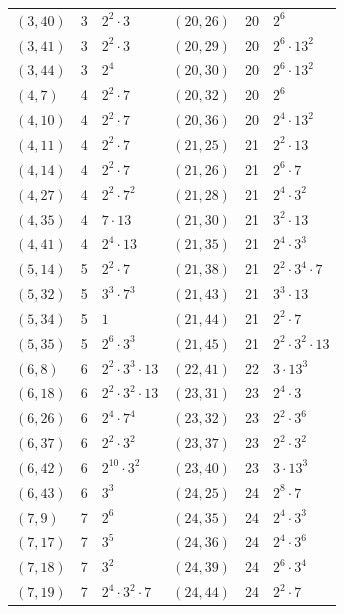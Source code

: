 \documentclass[11pt]{article}
\begin{document}
\begin{longtable}{@{}lrl@{\qquad}lrl@{}}
$(3,40)$ & 3 & $2^{2}\cdot 3$ & $(20,26)$ & 20 & $2^{6}$\\
$(3,41)$ & 3 & $2^{2}\cdot 3$ & $(20,29)$ & 20 & $2^{6}\cdot 13^{2}$\\
$(3,44)$ & 3 & $2^{4}$ & $(20,30)$ & 20 & $2^{6}\cdot 13^{2}$\\
$(4,7)$ & 4 & $2^{2}\cdot 7$ & $(20,32)$ & 20 & $2^{6}$\\
$(4,10)$ & 4 & $2^{2}\cdot 7$ & $(20,36)$ & 20 & $2^{4}\cdot 13^{2}$\\
$(4,11)$ & 4 & $2^{2}\cdot 7$ & $(21,25)$ & 21 & $2^{2}\cdot 13$\\
$(4,14)$ & 4 & $2^{2}\cdot 7$ & $(21,26)$ & 21 & $2^{6}\cdot 7$\\
$(4,27)$ & 4 & $2^{2}\cdot 7^{2}$ & $(21,28)$ & 21 & $2^{4}\cdot 3^{2}$\\
$(4,35)$ & 4 & $7\cdot 13$ & $(21,30)$ & 21 & $3^{2}\cdot 13$\\
$(4,41)$ & 4 & $2^{4}\cdot 13$ & $(21,35)$ & 21 & $2^{4}\cdot 3^{3}$\\
$(5,14)$ & 5 & $2^{2}\cdot 7$ & $(21,38)$ & 21 & $2^{2}\cdot 3^{4}\cdot 7$\\
$(5,32)$ & 5 & $3^{3}\cdot 7^{3}$ & $(21,43)$ & 21 & $3^{3}\cdot 13$\\
$(5,34)$ & 5 & $1$ & $(21,44)$ & 21 & $2^{2}\cdot 7$\\
$(5,35)$ & 5 & $2^{6}\cdot 3^{3}$ & $(21,45)$ & 21 & $2^{2}\cdot 3^{2}\cdot 13$\\
$(6,8)$ & 6 & $2^{2}\cdot 3^{3}\cdot 13$ & $(22,41)$ & 22 & $3\cdot 13^{3}$\\
$(6,18)$ & 6 & $2^{2}\cdot 3^{2}\cdot 13$ & $(23,31)$ & 23 & $2^{4}\cdot 3$\\
$(6,26)$ & 6 & $2^{4}\cdot 7^{4}$ & $(23,32)$ & 23 & $2^{2}\cdot 3^{6}$\\
$(6,37)$ & 6 & $2^{2}\cdot 3^{2}$ & $(23,37)$ & 23 & $2^{2}\cdot 3^{2}$\\
$(6,42)$ & 6 & $2^{10}\cdot 3^{2}$ & $(23,40)$ & 23 & $3\cdot 13^{3}$\\
$(6,43)$ & 6 & $3^{3}$ & $(24,25)$ & 24 & $2^{8}\cdot 7$\\
$(7,9)$ & 7 & $2^{6}$ & $(24,35)$ & 24 & $2^{4}\cdot 3^{3}$\\
$(7,17)$ & 7 & $3^{5}$ & $(24,36)$ & 24 & $2^{4}\cdot 3^{6}$\\
$(7,18)$ & 7 & $3^{2}$ & $(24,39)$ & 24 & $2^{6}\cdot 3^{4}$\\
$(7,19)$ & 7 & $2^{4}\cdot 3^{2}\cdot 7$ & $(24,44)$ & 24 & $2^{2}\cdot 7$\\

\end{longtable}
\end{document}
